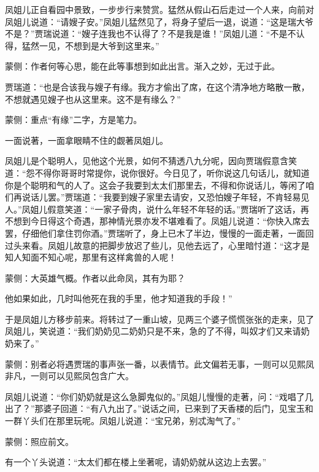 \begin{parag}
    凤姐儿正自看园中景致，一步步行来赞赏。猛然从假山石后走过一个人来，向前对凤姐儿说道：“请嫂子安。”凤姐儿猛然见了，将身子望后一退，说道：“这是瑞大爷不是？”贾瑞说道：“嫂子连我也不认得了？不是我是谁！”凤姐儿道：“不是不认得，猛然一见，不想到是大爷到这里来。”\begin{note}蒙侧：作者何等心思，能在此等事想到如此出言。渐入之妙，无过于此。\end{note}贾瑞道：“也是合该我与嫂子有缘。我方才偷出了席，在这个清净地方略散一散，不想就遇见嫂子也从这里来。这不是有缘么？”\begin{note}蒙侧：重点“有缘”二字，方是笔力。\end{note}一面说著，一面拿眼睛不住的觑著凤姐儿。
\end{parag}


\begin{parag}
    凤姐儿是个聪明人，见他这个光景，如何不猜透八九分呢，因向贾瑞假意含笑道：“怨不得你哥哥时常提你，说你很好。今日见了，听你说这几句话儿，就知道你是个聪明和气的人了。这会子我要到太太们那里去，不得和你说话儿，等闲了咱们再说话儿罢。”贾瑞道：“我要到嫂子家里去请安，又恐怕嫂子年轻，不肯轻易见人。”凤姐儿假意笑道：“一家子骨肉，说什么年轻不年轻的话。”贾瑞听了这话，再不想到今日得这个奇遇，那神情光景亦发不堪难看了。凤姐儿说道：“你快入席去罢，仔细他们拿住罚你酒。”贾瑞听了，身上已木了半边，慢慢的一面走著，一面回过头来看。凤姐儿故意的把脚步放迟了些儿，见他去远了，心里暗忖道：“这才是知人知面不知心呢，那里有这样禽兽的人呢！\begin{note}蒙侧：大英雄气概。作者以此命凤，其有为耶？\end{note}他如果如此，几时叫他死在我的手里，他才知道我的手段！”
\end{parag}


\begin{parag}
    于是凤姐儿方移步前来。将转过了一重山坡，见两三个婆子慌慌张张的走来，见了凤姐儿，笑说道：“我们奶奶见二奶奶只是不来，急的了不得，叫奴才们又来请奶奶来了。”\begin{note}蒙侧：别者必将遇贾瑞的事声张一番，以表情节。此文偏若无事，一则可以见熙凤非凡，一则可以见熙凤包含广大。\end{note}凤姐儿说道：“你们奶奶就是这么急脚鬼似的。”凤姐儿慢慢的走著，问：“戏唱了几出了？”那婆子回道：“有八九出了。”说话之间，已来到了天香楼的后门，见宝玉和一群丫头们在那里玩呢。凤姐儿说道：“宝兄弟，别忒淘气了。”\begin{note}蒙侧：照应前文。\end{note}有一个丫头说道：“太太们都在楼上坐著呢，请奶奶就从这边上去罢。”
\end{parag}


